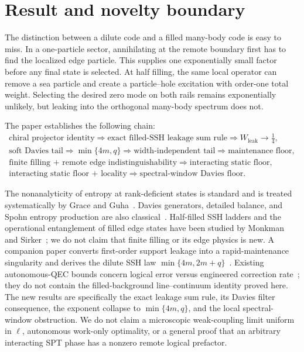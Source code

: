 \documentclass[11pt,a4paper]{article}
\theoremstyle{remark}
\begin{document}
\section{Result and novelty boundary}

The distinction between a dilute code and a filled many-body code is easy to miss.  In a one-particle sector, annihilating at the remote boundary first has to find the localized edge particle.  This supplies one exponentially small factor before any final state is selected.  At half filling, the same local operator can remove a sea particle and create a particle--hole excitation with order-one total weight.  Selecting the desired zero mode on both rails remains exponentially unlikely, but leaking into the orthogonal many-body spectrum does not.

The paper establishes the following chain:
\[
\begin{gathered}
\text{chiral projector identity}
\Longrightarrow
\text{exact filled-SSH leakage sum rule}
\Longrightarrow
W_{\mathrm{leak}}\to\tfrac14,\\
\text{soft Davies tail}
\Longrightarrow
\min\{4m,q\}
\Longrightarrow
\text{width-independent tail}\Longrightarrow\text{maintenance floor},\\
\text{finite filling + remote edge indistinguishability}
\Longrightarrow\text{interacting static floor},\\
\text{interacting static floor + locality}
\Longrightarrow\text{spectral-window Davies floor}.
\end{gathered}
\]

The nonanalyticity of entropy at rank-deficient states is standard and is treated systematically by Grace and Guha~\cite{GraceGuha}.  Davies generators, detailed balance, and Spohn entropy production are also classical~\cite{Davies,Spohn}.  Half-filled SSH ladders and the operational entanglement of filled edge states have been studied by Monkman and Sirker~\cite{MonkmanSirker}; we do not claim that finite filling or its edge physics is new.  A companion paper converts first-order support leakage into a rapid-maintenance singularity and derives the dilute SSH law $\min\{4m,2m+q\}$~\cite{ErikssonLeakage}.  Existing autonomous-QEC bounds concern logical error versus engineered correction rate~\cite{ShtankoEtAl}; they do not contain the filled-background line--continuum identity proved here.  The new results are specifically the exact leakage sum rule, its Davies filter consequence, the exponent collapse to $\min\{4m,q\}$, and the local spectral-window obstruction.  We do not claim a microscopic weak-coupling limit uniform in $\ell$, autonomous work-only optimality, or a general proof that an arbitrary interacting SPT phase has a nonzero remote logical prefactor.
\end{document}
